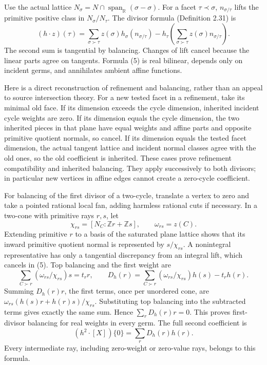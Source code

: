\documentclass[
  11pt,
]{article}
\begin{document}
Use the actual lattice
\(N_\sigma=N\cap\operatorname{span}_{\mathbb{R}}(\sigma-\sigma)\). For a
facet \(\tau\prec\sigma\), \(n_{\sigma/\tau}\) lifts the primitive
positive class in \(N_\sigma/N_\tau\). The divisor formula (Definition
2.31) is \[
 (h\cdot z)(\tau)=\sum_{\sigma\succ\tau}z(\sigma)h_\sigma(n_{\sigma/\tau})
       -h_\tau\left(\sum_{\sigma\succ\tau}z(\sigma)n_{\sigma/\tau}\right).
                                                               \tag{5}
\] The second sum is tangential by balancing. Changes of lift cancel
because the linear parts agree on tangents. Formula (5) is real
bilinear, depends only on incident germs, and annihilates ambient affine
functions.

Here is a direct reconstruction of refinement and balancing, rather than
an appeal to source intersection theory. For a new tested facet in a
refinement, take its minimal old face. If its dimension exceeds the
cycle dimension, inherited incident cycle weights are zero. If its
dimension equals the cycle dimension, the two inherited pieces in that
plane have equal weights and affine parts and opposite primitive
quotient normals, so cancel. If its dimension equals the tested facet
dimension, the actual tangent lattice and incident normal classes agree
with the old ones, so the old coefficient is inherited. These cases
prove refinement compatibility and inherited balancing. They apply
successively to both divisors; in particular new vertices in affine
edges cannot create a zero-cycle coefficient.

For balancing of the first divisor of a two-cycle, translate a vertex to
zero and take a pointed rational local fan, adding harmless rational
cuts if necessary. In a two-cone with primitive rays \(r,s\), let \[
 \chi_{rs}=[N_C:\mathbb{Z}r+\mathbb{Z}s],\qquad \omega_{rs}=z(C).
\] Extending primitive \(r\) to a basis of the saturated plane lattice
shows that its inward primitive quotient normal is represented by
\(s/\chi_{rs}\). A nonintegral representative has only a tangential
discrepancy from an integral lift, which cancels in (5). Top balancing
and the first weight are \[
 \sum_{C\succ r}(\omega_{rs}/\chi_{rs})s=t_r r,
 \qquad D_h(r)=\sum_{C\succ r}(\omega_{rs}/\chi_{rs})h(s)-t_rh(r). \tag{6}
\] Summing \(D_h(r)r\), the first terms, once per unordered cone, are
\(\omega_{rs}(h(s)r+h(r)s)/\chi_{rs}\). Substituting top balancing into
the subtracted terms gives exactly the same sum. Hence
\(\sum_rD_h(r)r=0\). This proves first-divisor balancing for real
weights in every germ. The full second coefficient is \[
                       (h^2\cdot[X])\{0\}=\sum_rD_h(r)h(r).     \tag{7}
\] Every intermediate ray, including zero-weight or zero-value rays,
belongs to this formula.
\end{document}
